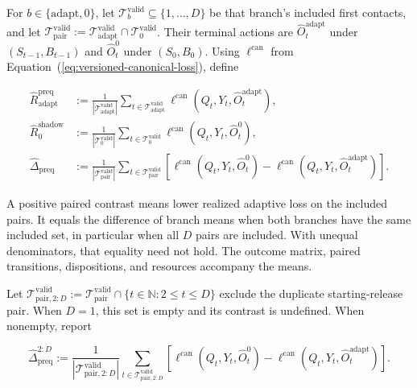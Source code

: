 \documentclass[10pt]{article} %
\renewcommand{\eqref}[1]{\textup{(\ref{#1})}}
\providecommand{\1}{\mathbf{1}}  %
\theoremstyle{remark}
\theoremstyle{definition}
\begin{document}
For $b\in\{\mathrm{adapt},0\}$, let
$\mathcal T_b^{\mathrm{valid}}\subseteq\{1,\ldots,D\}$ be that branch's
included first contacts, and let
$\mathcal T_{\mathrm{pair}}^{\mathrm{valid}}
:=\mathcal T_{\mathrm{adapt}}^{\mathrm{valid}}
\cap\mathcal T_0^{\mathrm{valid}}$.
Their terminal actions are $\widehat O_t^{\mathrm{adapt}}$ under
$(S_{t-1},B_{t-1})$ and $\widehat O_t^0$ under $(S_0,B_0)$.
Using $\ell^{\mathrm{can}}$ from
Equation~\eqref{eq:versioned-canonical-loss}, define

\begin{align}
\widehat R_{\mathrm{adapt}}^{\mathrm{preq}}
&:=
\frac{1}{|\mathcal T_{\mathrm{adapt}}^{\mathrm{valid}}|}
\sum_{t\in\mathcal T_{\mathrm{adapt}}^{\mathrm{valid}}}
\ell^{\mathrm{can}}\!\left(Q_t,Y_t,\widehat O_t^{\mathrm{adapt}}\right),
\label{eq:adaptive-prequential-risk}
\\
\widehat R_0^{\mathrm{shadow}}
&:=
\frac{1}{|\mathcal T_0^{\mathrm{valid}}|}
\sum_{t\in\mathcal T_0^{\mathrm{valid}}}
\ell^{\mathrm{can}}\!\left(Q_t,Y_t,\widehat O_t^0\right),
\label{eq:shadow-risk}
\\
\widehat\Delta_{\mathrm{preq}}
&:=
\frac{1}{|\mathcal T_{\mathrm{pair}}^{\mathrm{valid}}|}
\sum_{t\in\mathcal T_{\mathrm{pair}}^{\mathrm{valid}}}
\left[
\ell^{\mathrm{can}}\!\left(Q_t,Y_t,\widehat O_t^0\right)
-
\ell^{\mathrm{can}}\!\left(Q_t,Y_t,\widehat O_t^{\mathrm{adapt}}\right)
\right].
\label{eq:prequential-paired-contrast}
\end{align}

A positive paired contrast means lower realized adaptive loss on the
included pairs. It equals the difference of branch means when both
branches have the same included set, in particular when all $D$ pairs
are included. With unequal denominators, that equality need not hold.
The outcome matrix, paired transitions, dispositions, and resources
accompany the means.

Let $\mathcal T_{\mathrm{pair},2{:}D}^{\mathrm{valid}}
:=\mathcal T_{\mathrm{pair}}^{\mathrm{valid}}
\cap\{t\in\mathbb N:2\leq t\leq D\}$ exclude the duplicate starting-release
pair. When $D=1$, this set is empty and its contrast is undefined.
When nonempty, report

\begin{equation}
\widehat\Delta_{\mathrm{preq}}^{2{:}D}
:=
\frac{1}{|\mathcal T_{\mathrm{pair},2{:}D}^{\mathrm{valid}}|}
\sum_{t\in\mathcal T_{\mathrm{pair},2{:}D}^{\mathrm{valid}}}
\left[
\ell^{\mathrm{can}}(Q_t,Y_t,\widehat O_t^0)
-
\ell^{\mathrm{can}}(Q_t,Y_t,\widehat O_t^{\mathrm{adapt}})
\right].
\label{eq:prequential-paired-contrast-2-D}
\end{equation}
\end{document}
